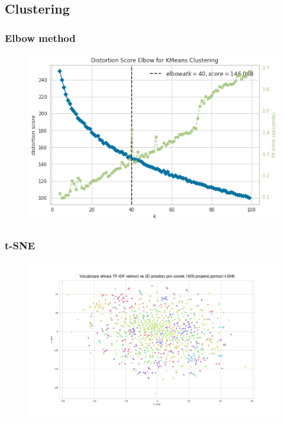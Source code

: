 \documentclass{beamer}
\begin{document}
\subsection{Clustering}
\begin{frame}
\frametitle{Elbow method}

  \vspace{10pt}
  \begin{figure}[t]
      \centering
      \includegraphics[width=.6\textwidth,height=\textheight,keepaspectratio]{figures/elbow.png}
      \label{fig:used}
  \end{figure}
\end{frame}

\begin{frame}
  \frametitle{t-SNE}

  \begin{figure}[t]
      \centering
      \includegraphics[width=\textwidth,height=\textheight,keepaspectratio]{figures/tfidf_tsne.pdf}
      \label{fig:used}
  \end{figure}
\end{frame}
\end{document}
